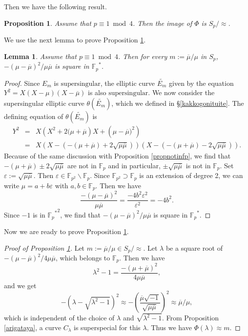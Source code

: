 \documentclass[10pt,a4paper]{amsart}
\theoremstyle{plain}
\newtheorem{prop}[defn]{Proposition}
\newtheorem{lem}[defn]{Lemma}
\newcommand{\lm}{\lambda}
\newcommand{\fp}{\mathbb{F}_p}
\newcommand{\fpp}{\mathbb{F}_{p^2}}
\newcommand{\super}{\text{supersingular}}
\begin{document}
Then we have the following result.
\begin{prop}
\label{resp1}
Assume that $p \equiv 1 \bmod4$. Then the image of $\Phi$ is $S_{p}/\approx$. 
\end{prop}

We use the next lemma to prove Proposition \ref{resp1}.
\begin{lem}
\label{munozyoukenn}
    Assume that $p \equiv 1 \bmod 4$. Then for every $m:=\overline{\mu}/{\mu}$ in $S_p$,
    $-(\mu-\overline{\mu})^2/\mu \overline{\mu}$ is square in ${\fp}^{*}$.
\end{lem}

\begin{proof}
    Since $E_m$ is $\super$, the elliptic curve
    $\widetilde{E_m}$ given by the equation $Y^2=X(X-\mu)(X-\overline{\mu})$ is also $\super$. We now consider the supersingular elliptic curve $\theta(\widetilde{E_m})$, which we defined in \S \ref{kakkogonituite}. The defining equation of $\theta(\widetilde{E_m})$ is
    \begin{eqnarray*}
Y^2&=&X\left(X^2+2(\mu+\overline{\mu}\right)X+\left(\mu-\overline{\mu})^2 \right)\\
&=&X \left(X-\left(-(\mu+\overline{\mu})+2\sqrt{\mu \overline{\mu}}\right) \right) \left(X- \left(-(\mu+\overline{\mu})-2\sqrt{\mu \overline{\mu}} \right) \right).
    \end{eqnarray*}
    Because of the same discussion with Proposition \ref{propnotinfp}, we find that $-(\mu+\overline{\mu}) \pm 2\sqrt{\mu \overline{\mu}}$ are not in $\fp$ and in particular, $\pm \sqrt{\mu \overline{\mu}}$ is not in $\fp$. Set $\varepsilon:=\sqrt{\mu \overline{\mu}}$. Then $\varepsilon \in \fpp \smallsetminus \fp$. Since $\fpp \supset \fp$ is an extension of degree 2, we can write $\mu=a+b\varepsilon$ with $a,b \in \fp$. Then we have
    \[
    \frac{-(\mu-\overline{\mu})^2}{\mu \overline{\mu}}=\frac{-4b^2 {\varepsilon}^2}{{\varepsilon}^2}=-4b^2.
    \]
    Since $-1$ is in ${{\fp}^{*}}^2$, we find that $-(\mu-\overline{\mu})^2/\mu \overline{\mu}$ is square in ${\fp}^{*}$.
\end{proof}

Now we are ready to prove Proposition \ref{resp1}.

\begin{proof}[Proof of Proposition \ref{resp1}]
Let $m:= \overline{\mu}/\mu \in S_p/\approx$. 
Let $\lm$ be a square root of $-(\mu-\overline{\mu})^2/4\mu \overline{\mu}$, which belongs to $\fp$. Then we have
\[
{\lm}^2-1=\frac{-(\mu+\overline{\mu})^2}{4\mu \overline{\mu}},
\]
and we get 
\[
-\left(\lm-\sqrt{{\lm}^2-1} \right)^2 \approx - \left( \frac{\overline{\mu}\sqrt{-1}}{\sqrt{\mu \overline{\mu}}} \right)^2 \approx \overline{\mu}/\mu,
\]
which is independent of the choice of $\lm$ and $\sqrt{{\lm}^2-1}$.
From Proposition \ref{arigataya}, a curve $C_{\lm}$ is superspecial for this $\lm$. Thus we have ${\Phi}(\lm) \approx m$.
\end{proof}
\end{document}
